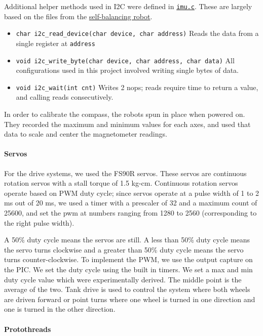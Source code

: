 \documentclass[]{article}
\providecommand{\tightlist}{%
  \setlength{\itemsep}{0pt}\setlength{\parskip}{0pt}}
\let\oldparagraph\paragraph
\renewcommand{\paragraph}[1]{\oldparagraph{#1}\mbox{}}
\begin{document}
Additional helper methods used in I2C were defined in
\href{generated/imu.c.html}{\texttt{imu.c}}. These are largely based on
the files from the
\protect\hyperlink{code-and-designs-borrowed-from-others}{self-balancing
robot}.

\begin{itemize}
\tightlist
\item
  \texttt{char\ i2c\_read\_device(char\ device,\ char\ address)} Reads
  the data from a single register at \texttt{address}
\item
  \texttt{void\ i2c\_write\_byte(char\ device,\ char\ address,\ char\ data)}
  All configurations used in this project involved writing single bytes
  of data.
\item
  \texttt{void\ i2c\_wait(int\ cnt)} Writes 2 nops; reads require time
  to return a value, and calling reads consecutively.
\end{itemize}

In order to calibrate the compass, the robots spun in place when powered
on. They recorded the maximum and minimum values for each axes, and used
that data to scale and center the magnetometer readings.

\hypertarget{servos}{%
\paragraph{Servos}\label{servos}}

For the drive systems, we used the FS90R servos. These servos are
continuous rotation servos with a stall torque of 1.5 kg-cm. Continuous
rotation servos operate based on PWM duty cycle; since servos operate at
a pulse width of 1 to 2 ms out of 20 ms, we used a timer with a
prescaler of 32 and a maximum count of 25600, and set the pwm at numbers
ranging from 1280 to 2560 (corresponding to the right pulse width).

A 50\% duty cycle means the servos are still. A less than 50\% duty
cycle means the servo turns clockwise and a greater than 50\% duty cycle
means the servo turns counter-clockwise. To implement the PWM, we use
the output capture on the PIC. We set the duty cycle using the built in
timers. We set a max and min duty cycle value which were experimentally
derived. The middle point is the average of the two. Tank drive is used
to control the system where both wheels are driven forward or point
turns where one wheel is turned in one direction and one is turned in
the other direction.

\hypertarget{protothreads}{%
\paragraph{Protothreads}\label{protothreads}}
\end{document}
